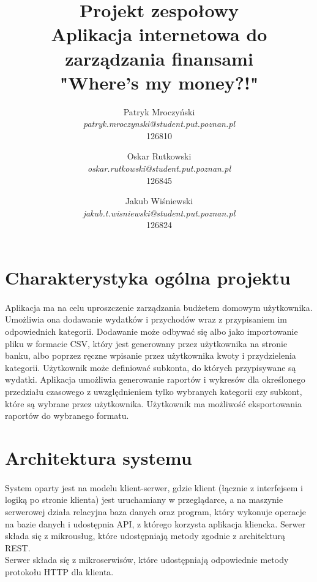 \documentclass{article}
\title{\Huge{
		\indexspace Projekt zespołowy \\[1cm] 
		\indexspace Aplikacja internetowa do zarządzania finansami \\[1cm]
		\indexspace \textbf{"Where's my money?!"}\\[4.9cm]}}
\author{Patryk Mroczyński \\ \textlangle{}\textit{patryk.mroczynski@student.put.poznan.pl}\textrangle{} \\126810
   \and Oskar Rutkowski \\ \textlangle{}\textit{oskar.rutkowski@student.put.poznan.pl}\textrangle{} \\126845 
   \and Jakub Wiśniewski \\ \textlangle{}\textit{jakub.t.wisniewski@student.put.poznan.pl}\textrangle{} \\126824}
\begin{document}
	
	\maketitle
	\newpage
	\tableofcontents
	\newpage
	
	\section{Charakterystyka ogólna projektu}
	\paragraph{} Aplikacja ma na celu uproszczenie zarządzania budżetem domowym użytkownika. Umożliwia ona dodawanie wydatków i przychodów wraz z przypisaniem im odpowiednich kategorii. Dodawanie może odbywać się albo jako importowanie pliku w formacie CSV, który jest generowany przez użytkownika na stronie banku, albo poprzez ręczne wpisanie przez użytkownika kwoty i przydzielenia kategorii. Użytkownik może definiować subkonta, do których przypisywane są wydatki. Aplikacja umożliwia generowanie raportów i wykresów dla określonego przedziału czasowego z uwzględnieniem tylko wybranych kategorii czy subkont, które są wybrane przez użytkownika. Użytkownik ma możliwość eksportowania raportów do wybranego formatu.
	\section{Architektura systemu}
	\paragraph{} System oparty jest na modelu klient-serwer, gdzie klient (łącznie z interfejsem i logiką po stronie klienta) jest uruchamiany w przeglądarce, a na maszynie serwerowej działa relacyjna baza danych oraz program, który wykonuje operacje na bazie danych i udostępnia API, z którego korzysta aplikacja kliencka. Serwer składa się z mikrousług, które udostępniają metody zgodnie z architekturą REST. \\[0.5cm]
	Serwer składa się z mikroserwisów, które udostępniają odpowiednie metody protokołu HTTP dla klienta.
	
\end{document}
